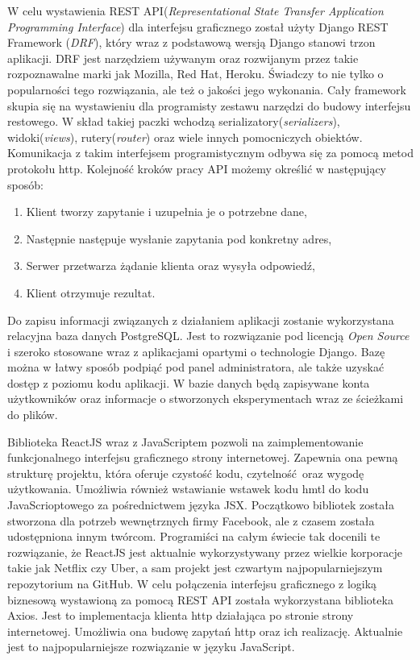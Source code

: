 W celu wystawienia REST API(\textit{Representational State Transfer Application Programming Interface}) dla interfejsu graficznego został użyty Django REST Framework (\textit{DRF}), który wraz z podstawową wersją Django stanowi trzon aplikacji. DRF jest narzędziem używanym oraz rozwijanym przez takie rozpoznawalne marki jak  Mozilla, Red Hat, Heroku.\cite{misc_django_rest} Świadczy to nie tylko o popularności tego rozwiązania, ale też o jakości jego wykonania. Cały framework skupia się na wystawieniu dla programisty zestawu narzędzi do budowy interfejsu restowego. W skład takiej paczki wchodzą serializatory(\textit{serializers}), widoki(\textit{views}), rutery(\textit{router}) oraz wiele innych pomocniczych obiektów. Komunikacja z takim interfejsem programistycznym odbywa się za pomocą metod protokołu http. Kolejność kroków pracy API możemy określić w następujący sposób:
\begin{enumerate}
	\item Klient tworzy zapytanie i uzupełnia je o potrzebne dane, 
	\item Następnie następuje wysłanie zapytania pod konkretny adres,
	\item Serwer przetwarza żądanie klienta oraz wysyła odpowiedź,
	\item Klient otrzymuje rezultat.
\end{enumerate}

Do zapisu informacji związanych z działaniem aplikacji zostanie wykorzystana relacyjna baza danych PostgreSQL. Jest to rozwiązanie pod licencją \textit{Open Source} i szeroko stosowane wraz z aplikacjami opartymi o technologie Django. Bazę można w łatwy sposób podpiąć pod panel administratora, ale także uzyskać dostęp z poziomu kodu aplikacji. W bazie danych będą zapisywane konta użytkowników oraz informacje o stworzonych eksperymentach wraz ze ścieżkami do plików. 

Biblioteka ReactJS wraz z JavaScriptem pozwoli na zaimplementowanie funkcjonalnego interfejsu graficznego strony internetowej. Zapewnia ona pewną strukturę projektu, która oferuje czystość kodu, czytelność oraz wygodę użytkowania. Umożliwia również wstawianie wstawek kodu hmtl do kodu JavaScrioptowego za pośrednictwem języka JSX. Początkowo bibliotek została stworzona dla potrzeb wewnętrznych firmy Facebook, ale z czasem została udostępniona innym twórcom.\cite{misc_react} Programiści na całym świecie tak docenili te rozwiązanie, że ReactJS jest aktualnie wykorzystywany przez wielkie korporacje takie jak Netflix czy Uber, a sam projekt jest czwartym najpopularniejszym repozytorium na GitHub.\cite{misc_react_pop} W celu połączenia interfejsu graficznego z logiką biznesową wystawioną za pomocą REST API została wykorzystana biblioteka Axios.\cite{misc_axios} Jest to implementacja klienta http działająca po stronie strony internetowej. Umożliwia ona budowę zapytań http oraz ich realizację. Aktualnie jest to najpopularniejsze rozwiązanie w języku JavaScript. 


